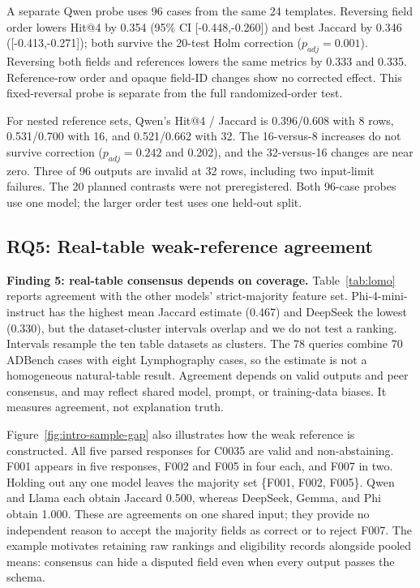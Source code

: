 \documentclass[conference]{IEEEtran}
\begin{document}
A separate Qwen probe uses 96 cases from the same 24 templates. Reversing field order lowers Hit@4 by 0.354 (95\% CI [-0.448,-0.260]) and best Jaccard by 0.346 ([-0.413,-0.271]); both survive the 20-test Holm correction ($p_{adj}=0.001$). Reversing both fields and references lowers the same metrics by 0.333 and 0.335. Reference-row order and opaque field-ID changes show no corrected effect. This fixed-reversal probe is separate from the full randomized-order test.

For nested reference sets, Qwen's Hit@4 / Jaccard is 0.396/0.608 with 8 rows, 0.531/0.700 with 16, and 0.521/0.662 with 32. The 16-versus-8 increases do not survive correction ($p_{adj}=0.242$ and 0.202), and the 32-versus-16 changes are near zero. Three of 96 outputs are invalid at 32 rows, including two input-limit failures. The 20 planned contrasts were not preregistered. Both 96-case probes use one model; the larger order test uses one held-out split.

\subsection{RQ5: Real-table weak-reference agreement}
\textbf{Finding 5: real-table consensus depends on coverage.} Table~\ref{tab:lomo} reports agreement with the other models' strict-majority feature set. Phi-4-mini-instruct has the highest mean Jaccard estimate (0.467) and DeepSeek the lowest (0.330), but the dataset-cluster intervals overlap and we do not test a ranking. Intervals resample the ten table datasets as clusters. The 78 queries combine 70 ADBench cases with eight Lymphography cases, so the estimate is not a homogeneous natural-table result. Agreement depends on valid outputs and peer consensus, and may reflect shared model, prompt, or training-data biases. It measures agreement, not explanation truth.

Figure~\ref{fig:intro-sample-gap} also illustrates how the weak reference is constructed. All five parsed responses for C0035 are valid and non-abstaining. F001 appears in five responses, F002 and F005 in four each, and F007 in two. Holding out any one model leaves the majority set \{F001, F002, F005\}. Qwen and Llama each obtain Jaccard 0.500, whereas DeepSeek, Gemma, and Phi obtain 1.000. These are agreements on one shared input; they provide no independent reason to accept the majority fields as correct or to reject F007. The example motivates retaining raw rankings and eligibility records alongside pooled means: consensus can hide a disputed field even when every output passes the schema.
\end{document}
